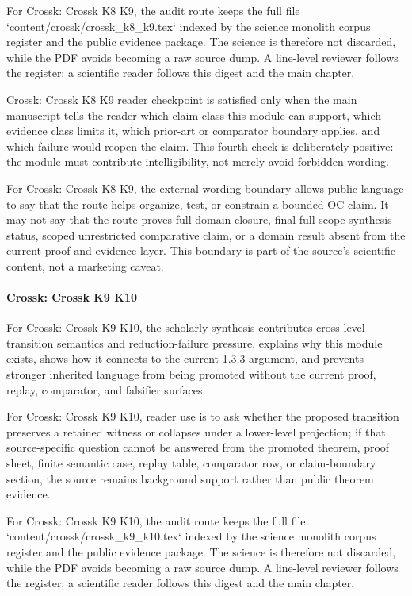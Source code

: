 For Crossk: Crossk K8 K9, the audit route keeps the full file `content/crossk/crossk\_k8\_k9.tex` indexed by the science monolith corpus register and the public evidence package. The science is therefore not discarded, while the PDF avoids becoming a raw source dump. A line-level reviewer follows the register; a scientific reader follows this digest and the main chapter.


Crossk: Crossk K8 K9 reader checkpoint is satisfied only when the main manuscript tells the reader which claim class this module can support, which evidence class limits it, which prior-art or comparator boundary applies, and which failure would reopen the claim. This fourth check is deliberately positive: the module must contribute intelligibility, not merely avoid forbidden wording.


For Crossk: Crossk K8 K9, the external wording boundary allows public language to say that the route helps organize, test, or constrain a bounded OC claim. It may not say that the route proves full-domain closure, final full-scope synthesis status, scoped unrestricted comparative claim, or a domain result absent from the current proof and evidence layer. This boundary is part of the source's scientific content, not a marketing caveat.


\paragraph{Crossk: Crossk K9 K10}

For Crossk: Crossk K9 K10, the scholarly synthesis contributes cross-level transition semantics and reduction-failure pressure, explains why this module exists, shows how it connects to the current 1.3.3 argument, and prevents stronger inherited language from being promoted without the current proof, replay, comparator, and falsifier surfaces.


For Crossk: Crossk K9 K10, reader use is to ask whether the proposed transition preserves a retained witness or collapses under a lower-level projection; if that source-specific question cannot be answered from the promoted theorem, proof sheet, finite semantic case, replay table, comparator row, or claim-boundary section, the source remains background support rather than public theorem evidence.


For Crossk: Crossk K9 K10, the audit route keeps the full file `content/crossk/crossk\_k9\_k10.tex` indexed by the science monolith corpus register and the public evidence package. The science is therefore not discarded, while the PDF avoids becoming a raw source dump. A line-level reviewer follows the register; a scientific reader follows this digest and the main chapter.


